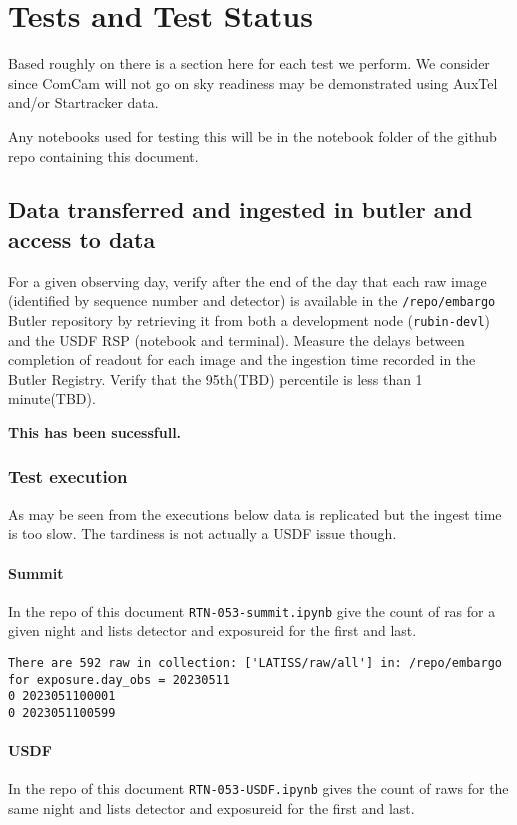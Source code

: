\section{Tests and Test Status} \label{sec:testing}
Based roughly on  there is a section here for each test we perform.
We consider since ComCam will not go on sky readiness may be demonstrated using AuxTel and/or Startracker data.

Any notebooks used for testing this will be in the notebook folder of the github repo containing this document.

\subsection{Data transferred and ingested in butler and access to data}
For a given observing day, verify after the end of the day that each raw image (identified by sequence number and detector) is available in the \texttt{/repo/embargo} Butler repository by retrieving it from both a development node (\texttt{rubin-devl}) and the USDF RSP (notebook and terminal).
Measure the delays between completion of readout for each image and the ingestion time recorded in the Butler Registry.
Verify that the 95th(TBD) percentile is less than 1 minute(TBD).

\textbf{This has been sucessfull.}

\subsubsection{Test execution}
As may be seen from the executions below data is replicated but the ingest time is too slow.
The tardiness is not actually a USDF issue though.
\paragraph{Summit}
In the repo of this document \texttt{RTN-053-summit.ipynb} give the count of ras for a given night and lists detector and exposureid for the first and last.
\begin{verbatim}
There are 592 raw in collection: ['LATISS/raw/all'] in: /repo/embargo for exposure.day_obs = 20230511
0 2023051100001
0 2023051100599
\end{verbatim}

\paragraph{USDF}
In the repo of this document \texttt{RTN-053-USDF.ipynb} gives the count of raws for the same night and lists detector and exposureid for the first and last.

